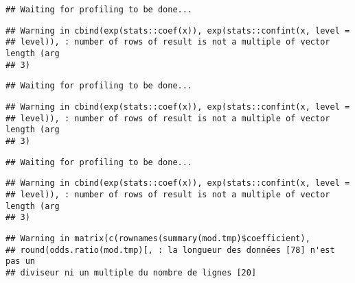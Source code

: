\documentclass[]{article}
\newenvironment{Shaded}{\begin{snugshade}}{\end{snugshade}}
\newcommand{\KeywordTok}[1]{\textcolor[rgb]{0.13,0.29,0.53}{\textbf{#1}}}
\newcommand{\DataTypeTok}[1]{\textcolor[rgb]{0.13,0.29,0.53}{#1}}
\newcommand{\StringTok}[1]{\textcolor[rgb]{0.31,0.60,0.02}{#1}}
\newcommand{\OperatorTok}[1]{\textcolor[rgb]{0.81,0.36,0.00}{\textbf{#1}}}
\newcommand{\NormalTok}[1]{#1}
\begin{document}
\begin{verbatim}
## Waiting for profiling to be done...
\end{verbatim}

\begin{verbatim}
## Warning in cbind(exp(stats::coef(x)), exp(stats::confint(x, level =
## level)), : number of rows of result is not a multiple of vector length (arg
## 3)
\end{verbatim}

\begin{verbatim}
## Waiting for profiling to be done...
\end{verbatim}

\begin{verbatim}
## Warning in cbind(exp(stats::coef(x)), exp(stats::confint(x, level =
## level)), : number of rows of result is not a multiple of vector length (arg
## 3)
\end{verbatim}

\begin{verbatim}
## Waiting for profiling to be done...
\end{verbatim}

\begin{verbatim}
## Warning in cbind(exp(stats::coef(x)), exp(stats::confint(x, level =
## level)), : number of rows of result is not a multiple of vector length (arg
## 3)
\end{verbatim}

\begin{verbatim}
## Warning in matrix(c(rownames(summary(mod.tmp)$coefficient),
## round(odds.ratio(mod.tmp)[, : la longueur des données [78] n'est pas un
## diviseur ni un multiple du nombre de lignes [20]
\end{verbatim}

\begin{Shaded}
\end{Shaded}
\end{document}
